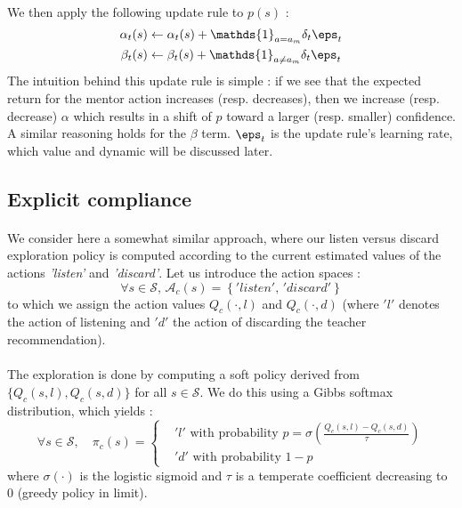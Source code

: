\documentclass[a4paper]{report}
\begin{document}
{{{{			\paragraph{} We then apply the following update rule to $p(s)$ : 
			\begin{equation}
				\label{eq::update_rule}
				\begin{aligned}
					\alpha_t(s) &\leftarrow \alpha_t(s) +  \mathds{1}_{a=a_m}\delta_t \eps_t\\
					\beta_t(s) &\leftarrow \beta_t(s) +   \mathds{1}_{a\neq a_m}\delta_t \eps_t
				\end{aligned}
			\end{equation}
			The intuition behind this update rule is simple : if we see that the expected return for the mentor action increases (resp. decreases), then we increase (resp. decrease) $\alpha$ which results in a shift of $p$ toward a larger (resp. smaller) confidence. A similar reasoning holds for the $\beta$ term.  $\eps_t$ is the update rule's learning rate, which value and dynamic will be discussed later. 
		
		}
	
		\subsection{Explicit compliance}
		{
			\paragraph{} We consider here a somewhat similar approach, where our listen versus discard exploration policy is computed according to the current estimated values of the actions \emph{'listen'} and \emph{'discard'}. Let us introduce the action spaces : 
			\begin{equation}
				\forall s\in\mathcal{S}, \, \mathcal{A}_c(s) = \left\{ 'listen', \, 'discard'\right\}
			\end{equation}
			to which we assign the action values $Q_c(\cdot,l)$ and  $Q_c(\cdot,d)$ (where $'l'$ denotes the action of listening and $'d'$ the action of discarding the teacher recommendation). 
			
			\paragraph{} The exploration is done by computing a soft policy derived from $\{Q_c(s,l), Q_c(s,d)\}$ for all $s\in\mathcal{S}$. We do this using a Gibbs softmax distribution, which yields : 
			\begin{equation}
				\forall s \in\mathcal{S}, \quad \pi_c(s) = 
					\left\{
						\begin{aligned}
							&'l' \text{ with probability } p=\sigma\left(\frac{Q_c(s,l) - Q_c(s,d)}{\tau} \right) \\
							& 'd'  \text{ with probability } 1-p
						\end{aligned}
					\right.
			\end{equation}
			where $\sigma(\cdot)$ is the logistic sigmoid and $\tau$ is a temperate coefficient decreasing to $0$ (greedy policy in limit). 
			
}}}}
\end{document}
